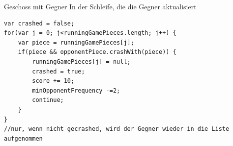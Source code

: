 \documentclass[18pt]{beamer}
\begin{document}
\begin{frame}[fragile]{Geschoss mit Gegner}
In der Schleife, die die Gegner aktualisiert
\begin{lstlisting}
var crashed = false;
for(var j = 0; j<runningGamePieces.length; j++) {
	var piece = runningGamePieces[j];
	if(piece && opponentPiece.crashWith(piece)) {
		runningGamePieces[j] = null;
		crashed = true;
		score += 10;
		minOpponentFrequency -=2;
		continue;
	}
}
//nur, wenn nicht gecrashed, wird der Gegner wieder in die Liste aufgenommen
\end{lstlisting}
\end{frame}
\end{document}
